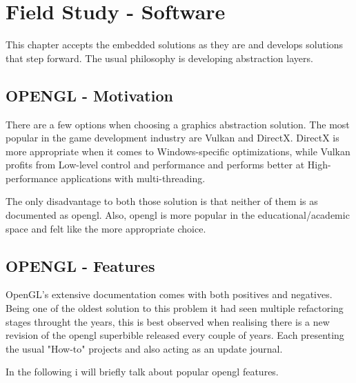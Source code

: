 

\chapter*{Field Study - Software}
  This chapter accepts the embedded solutions as they are and develops solutions that step forward. 
  The usual philosophy is developing abstraction layers.

    \section*{OPENGL - Motivation}
        There are a few options when choosing a graphics abstraction solution. The most popular in the game development industry are Vulkan and DirectX. DirectX is more appropriate when it comes to Windows-specific optimizations, while Vulkan profits from Low-level control and performance and performs better at High-performance applications with multi-threading.

        The only disadvantage to both those solution is that neither of them is as documented as opengl. Also, opengl is more popular in the educational/academic space and felt like the more appropriate choice.

    \section*{OPENGL - Features}
        OpenGL's extensive documentation comes with both positives and negatives. Being one of the oldest solution to this problem it had seen multiple refactoring stages throught the years, this is best observed when realising there is a new revision of the opengl superbible released every couple of years. Each presenting the usual "How-to" projects and also acting as an update journal.

        \pagebreak

        In the following i will briefly talk about popular opengl features.

